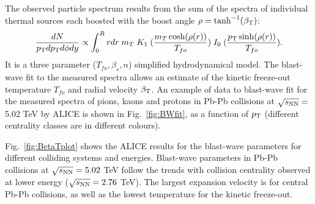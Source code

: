 The observed particle spectrum results from the sum 
of the spectra of individual thermal sources each boosted with the 
boost angle $\rho = \tanh^{-1}(\beta_{\rm T})$:
\begin{equation}
\label{eq:BlastWave}
\frac{dN}{p_{\rm T} dp_{\rm T} d\phi dy}\propto \int_{0}^{R} r dr\;  m_{T}\;  K_{1} \; (\frac{m_{T} \cosh(\rho(r))}{T_{fo}})\;  I_{0}\; (\frac{p_{\rm T} \sinh(\rho(r))}{T_{fo}}).
\end{equation}
It is a three parameter ($T_{fo}, \beta_s, n$) simplified hydrodynamical model.
The blast-wave fit to the measured spectra allows
  an estimate of the kinetic freeze-out temperature $T_{fo}$ and 
  radial velocity $\beta_{\rm T}$. An example of data to blast-wave fit for the 
  measured spectra of pions, kaons and protons in Pb-Pb collisions at $\sqrt{s_{\rm NN}} = $ 5.02 TeV 
   by ALICE is shown in Fig.~\ref{fig:BWfit}, as a function of $p_{\rm T}$ (different centrality classes 
   are in different colours).
  
Fig.~\ref{fig:BetaTplot} shows the ALICE results 
for the blast-wave parameters for different colliding systems and energies. Blast-wave parameters
  in Pb-Pb collisions at $\sqrt{s_{\rm NN}} = 5.02$ TeV follow the trends with collision centrality observed at
   lower energy ($\sqrt{s_{\rm NN}} = 2.76$ TeV). The largest expansion velocity 
   is for central Pb-Pb collisions, as well as the lowest temperature
    for the kinetic freeze-out.\\


